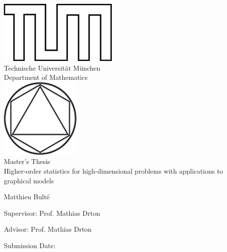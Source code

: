 
\pagestyle{empty}

\begin{titlepage}
    \begin{center}
    \includegraphics{TUMlschwarz.png}\\[3mm]
    \sf
    {\Large
      Technische Universit\"at M\"unchen\\[5mm]
      Department of Mathematics\\[8mm]
    }
    \normalsize
    \includegraphics{TUMlMschwarz.png}\\[15mm]
    
    Master's Thesis\\[15mm]
    
    {\Huge
    Higher-order statistics for high-dimensional problems with applications to graphical models
    }
    \bigskip
    
    \normalsize
    
    Matthieu Bult\'e
    \end{center}
    \vspace*{75mm}
    
    Supervisor: Prof. Mathias Drton
    \medskip
    
    Advisor: Prof. Mathias Drton
    \medskip
    
    Submission Date: 
    
\end{titlepage}



\newpage


\newpage


\newpage


\newpage
{}
\pagestyle{headings}